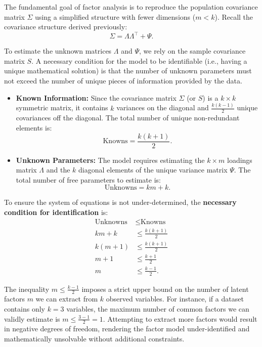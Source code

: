 \documentclass[12pt]{article}
\begin{document}
The fundamental goal of factor analysis is to reproduce the population covariance matrix $\Sigma$ using a simplified structure with fewer dimensions ($m < k$). Recall the covariance structure derived previously:
\[
\Sigma = \Lambda\Lambda^\top + \Psi.
\]

To estimate the unknown matrices $\Lambda$ and $\Psi$, we rely on the sample covariance matrix $S$. A necessary condition for the model to be identifiable (i.e., having a unique mathematical solution) is that the number of unknown parameters must not exceed the number of unique pieces of information provided by the data.

\begin{itemize}
    \item \textbf{Known Information:} Since the covariance matrix $\Sigma$ (or $S$) is a $k \times k$ symmetric matrix, it contains $k$ variances on the diagonal and $\frac{k(k-1)}{2}$ unique covariances off the diagonal. The total number of unique non-redundant elements is:
    \[ \text{Knowns} = \frac{k(k+1)}{2}. \]
    \item \textbf{Unknown Parameters:} The model requires estimating the $k \times m$ loadings matrix $\Lambda$ and the $k$ diagonal elements of the unique variance matrix $\Psi$. The total number of free parameters to estimate is:
    \[ \text{Unknowns} = km + k. \]
\end{itemize}

To ensure the system of equations is not under-determined, the \textbf{necessary condition for identification} is:
\begin{align*}
    \text{Unknowns} &\le \text{Knowns} \\
    km + k &\le \frac{k(k+1)}{2} \\
    k(m + 1) &\le \frac{k(k+1)}{2}\\
    m + 1 &\le \frac{k+1}{2} \\
    m &\le \frac{k-1}{2}.
\end{align*}

\begin{remark}
The inequality $m \le \frac{k-1}{2}$ imposes a strict upper bound on the number of latent factors $m$ we can extract from $k$ observed variables. For instance, if a dataset contains only $k=3$ variables, the maximum number of common factors we can validly estimate is $m \le \frac{3-1}{2} = 1$. Attempting to extract more factors would result in negative degrees of freedom, rendering the factor model under-identified and mathematically unsolvable without additional constraints.
\end{remark}
\end{document}

